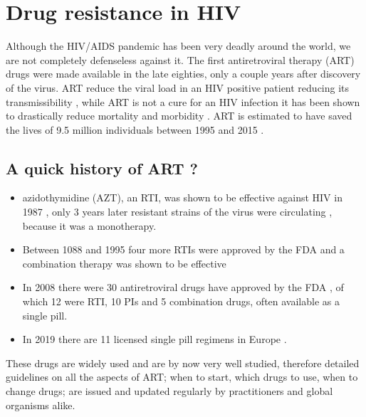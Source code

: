 \documentclass[
  11pt,
  twoside]{scrbook}
\begin{document}
\hypertarget{drug-resistance-in-hiv}{%
\section{Drug resistance in HIV}\label{drug-resistance-in-hiv}}

Although the HIV/AIDS pandemic has been very deadly around the world, we are not completely defenseless against it. The first antiretroviral therapy (ART) drugs were made available in the late eighties, only a couple years after discovery of the virus. ART reduce the viral load in an HIV positive patient reducing its transmissibility \autocite{eisingerHIVViralLoad2019}, while ART is not a cure for an HIV infection it has been shown to drastically reduce mortality and morbidity \autocite{palellaDecliningMorbidityMortality1998}. ART is estimated to have saved the lives of 9.5 million individuals between 1995 and 2015 \autocite{forsytheTwentyYearsAntiretroviral2019}.

\hypertarget{a-quick-history-of-art}{%
\subsection{A quick history of ART ?}\label{a-quick-history-of-art}}

\begin{itemize}
\item
  azidothymidine (AZT), an RTI, was shown to be effective against HIV in 1987 \autocite{fischlEfficacyAzidothymidineAZT1987}, only 3 years later resistant strains of the virus were circulating \autocite{richmanSusceptibilityNucleosideAnalogues1990}, because it was a monotherapy.
\item
  Between 1088 and 1995 four more RTIs were approved by the FDA and a combination therapy was shown to be effective \autocite{gulickTreatmentIndinavirZidovudine1997}
\item
  In 2008 there were 30 antiretroviral drugs have approved by the FDA \autocite{palmisanoBriefHistoryAntiretroviral2011}, of which 12 were RTI, 10 PIs and 5 combination drugs, often available as a single pill.
\item
  In 2019 there are 11 licensed single pill regimens in Europe \autocite{OnepilladayHIVTreatments}.
\end{itemize}

These drugs are widely used and are by now very well studied, therefore detailed guidelines on all the aspects of ART; when to start, which drugs to use, when to change drugs; are issued and updated regularly by practitioners \autocite{zolopaEvolutionHIVTreatment2010} and global organisms \autocite{worldhealthorganizationConsolidatedGuidelinesHIV2021} alike.
\end{document}
